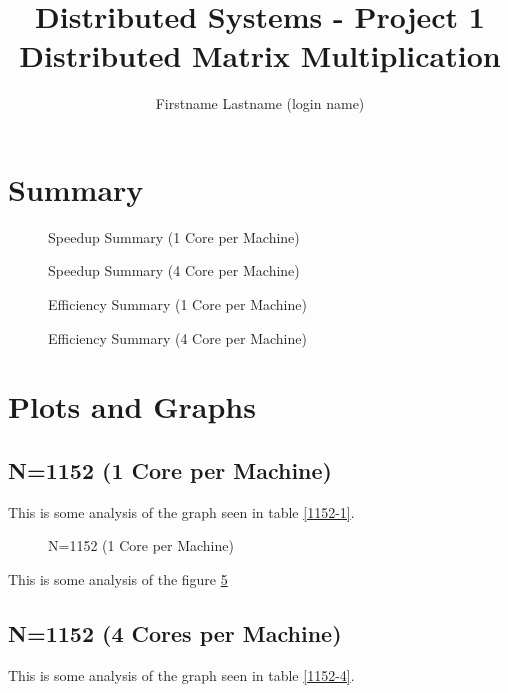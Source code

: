 \documentclass[a4paper]{article}
\title{Distributed Systems - Project 1 \\ Distributed Matrix Multiplication}
\author{Firstname Lastname (login name)}
\begin{document}
\maketitle

\section{Summary}

\begin{figure}
    
    \caption{Speedup Summary (1 Core per Machine)}
    \label{fig:speedup_no_cores}
\end{figure}

\begin{figure}
    
    \caption{Speedup Summary (4 Core per Machine)}
    \label{fig:speedup_cores}
\end{figure}

\begin{figure}
    
    \caption{Efficiency Summary (1 Core per Machine)}
    \label{fig:efficiency_no_cores}
\end{figure}

\begin{figure}
    
    \caption{Efficiency Summary (4 Core per Machine)}
    \label{fig:efficiency_cores}
\end{figure}

\section{Plots and Graphs}

\subsection{N=1152 (1 Core per Machine)}

This is some analysis of the graph seen in table \ref{1152-1}.

\begin{figure}
    
    \caption{N=1152 (1 Core per Machine)}
    \label{fig:1152_1}
\end{figure}

This is some analysis of the figure \ref{fig:1152_1}

\subsection{N=1152 (4 Cores per Machine)}

This is some analysis of the graph seen in table \ref{1152-4}.
\end{document}
